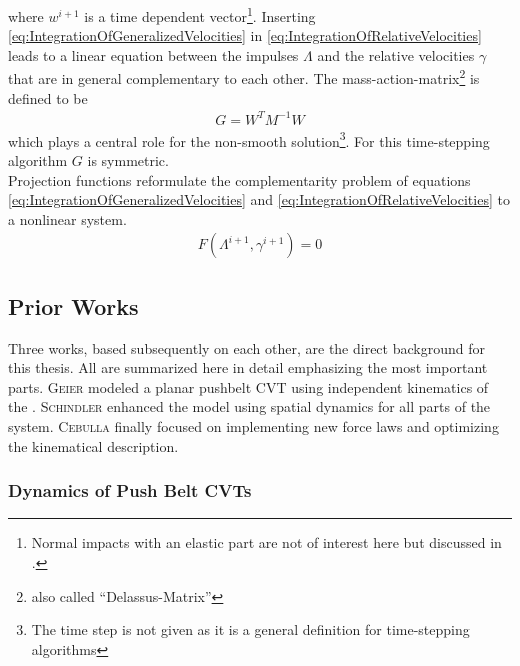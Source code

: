 %
where $w^{i+1}$ is a time dependent vector\footnote{Normal impacts with an elastic part are not of interest here but discussed in \cite{glocker_dynamik_1995, forg_mehrkorpersysteme_2007}.}.
Inserting \eqref{eq:IntegrationOfGeneralizedVelocities} in \eqref{eq:IntegrationOfRelativeVelocities} leads to a linear equation between the impulses $\Lambda$ and the relative velocities $\gamma$ that are in general complementary to each other.
The mass-action-matrix\footnote{also called ``Delassus-Matrix''} is defined to be
%
\begin{align}
  \label{eq:MassActionMatrix}
  G = W^T M^{-1} W
\end{align}
%
which plays a central role for the non-smooth solution\footnote{The time step is not given as it is a general definition for time-stepping algorithms}.
For this time-stepping algorithm $G$ is symmetric.\\
Projection functions reformulate the complementarity problem of equations \eqref{eq:IntegrationOfGeneralizedVelocities} and \eqref{eq:IntegrationOfRelativeVelocities} to a nonlinear system.
%
\begin{align}
  \label{eq:NonlinearFunctionUsingProx}
  F(\Lambda^{i+1}, \gamma^{i+1}) = 0
\end{align}
%
\subsection{Prior Works}
\label{subsec:PriorWork}

Three works, based subsequently on each other, are the direct background for this thesis. 
All are summarized here in detail emphasizing the most important parts. 
\textsc{Geier} modeled a planar pushbelt CVT using independent kinematics of the \els. 
\textsc{Schindler} enhanced the model using spatial dynamics for all parts of the system. 
\textsc{Cebulla} finally focused on implementing new force laws and optimizing the kinematical description.

\subsubsection{Dynamics of Push Belt CVTs}


